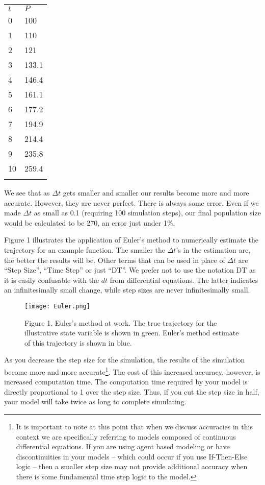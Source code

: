 \documentclass[]{memoir}
\makeatletter
\def\maxwidth{\ifdim\Gin@nat@width>\linewidth\linewidth
\else\Gin@nat@width\fi}
\let\Oldincludegraphics\includegraphics
\renewcommand{\includegraphics}[1]{\Oldincludegraphics[width=\maxwidth]{#1}}
\makeatother
\begin{document}
\begin{longtable}[c]{@{}ll@{}}
\hline\noalign{\medskip}
$t$ & $P$
\\\noalign{\medskip}
\hline\noalign{\medskip}
0 & 100
\\\noalign{\medskip}
1 & 110
\\\noalign{\medskip}
2 & 121
\\\noalign{\medskip}
3 & 133.1
\\\noalign{\medskip}
4 & 146.4
\\\noalign{\medskip}
5 & 161.1
\\\noalign{\medskip}
6 & 177.2
\\\noalign{\medskip}
7 & 194.9
\\\noalign{\medskip}
8 & 214.4
\\\noalign{\medskip}
9 & 235.8
\\\noalign{\medskip}
10 & 259.4
\\\noalign{\medskip}
\hline
\end{longtable}

We see that as $\Delta t$ gets smaller and smaller our results become
more and more accurate. However, they are never perfect. There is always
some error. Even if we made $\Delta t$ as small as 0.1 (requiring 100
simulation steps), our final population size would be calculated to be
270, an error just under 1\%.

Figure 1 illustrates the application of Euler's method to numerically
estimate the trajectory for an example function. The smaller the
$\Delta t$'s in the estimation are, the better the results will be.
Other terms that can be used in place of $\Delta t$ are ``Step Size'',
``Time Step'' or just ``DT''. We prefer not to use the notation DT as it
is easily confusable with the $dt$ from differential equations. The
latter indicates an infinitesimally small change, while step sizes are
never infinitesimally small.

\begin{figure}[htbp]
\centering
\texttt{[image: Euler.png]}
\caption{Figure 1. Euler's method at work. The true trajectory for the
illustrative state variable is shown in green. Euler's method estimate
of this trajectory is shown in blue.}
\end{figure}

As you decrease the step size for the simulation, the results of the
simulation become more and more accurate\footnote{It is important to
  note at this point that when we discuss accuracies in this context we
  are specifically referring to models composed of continuous
  differential equations. If you are using agent based modeling or have
  discontinuities in your models -- which could occur if you use
  If-Then-Else logic -- then a smaller step size may not provide
  additional accuracy when there is some fundamental time step logic to
  the model.}. The cost of this increased accuracy, however, is
increased computation time. The computation time required by your model
is directly proportional to 1 over the step size. Thus, if you cut the
step size in half, your model will take twice as long to complete
simulating.
\end{document}
